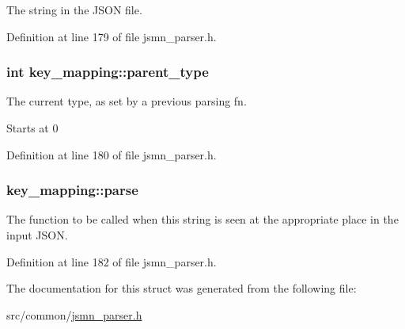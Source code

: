 The string in the J\-S\-O\-N file. 



Definition at line 179 of file jsmn\-\_\-parser.\-h.

\hypertarget{structkey__mapping_ae5ee4a8838ac3c188143edb081e78207}{
\subsubsection[{parent\-\_\-type}]{\setlength{\rightskip}{0pt plus 5cm}int key\-\_\-mapping\-::parent\-\_\-type}}\label{structkey__mapping_ae5ee4a8838ac3c188143edb081e78207}


The current type, as set by a previous parsing fn. 

Starts at 0 

Definition at line 180 of file jsmn\-\_\-parser.\-h.

\hypertarget{structkey__mapping_a5aaab47c145def7d5d253d8e3309b993}{
\subsubsection[{parse}]{ key\-\_\-mapping\-::parse}}\label{structkey__mapping_a5aaab47c145def7d5d253d8e3309b993}


The function to be called when this string is seen at the appropriate place in the input J\-S\-O\-N. 



Definition at line 182 of file jsmn\-\_\-parser.\-h.



The documentation for this struct was generated from the following file\-:\begin{DoxyCompactItemize}
\item 
src/common/\hyperlink{jsmn__parser_8h}{jsmn\-\_\-parser.\-h}\end{DoxyCompactItemize}
